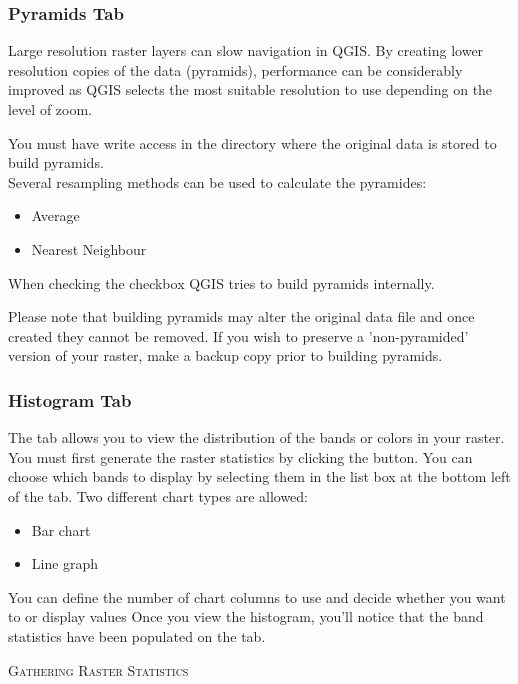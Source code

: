 \subsubsection{Pyramids Tab}\label{raster_pyramids}

Large resolution raster layers can slow navigation in QGIS. By creating lower
resolution copies of the data (pyramids), performance can be considerably
improved as QGIS selects the most suitable resolution to use depending on the
level of zoom.

You must have write access in the directory where the original data is stored
to build pyramids. \\
Several resampling methods can be used to calculate the pyramides:
\begin{itemize}
\item Average
\item Nearest Neighbour
\end{itemize}

When checking the checkbox  QGIS tries to build pyramids internally.

Please note that building pyramids may alter the original data file and once
created they cannot be removed. If you wish to preserve a 'non-pyramided'
version of your raster, make a backup copy prior to building pyramids.

\subsubsection{Histogram Tab}\label{label_histogram}

The  tab allows you to view the distribution 
of the bands or colors in your raster. You must first generate the raster statistics 
by clicking the  button. You can choose which bands to display by 
selecting them in the list box at the bottom left of the tab. Two different
chart types are allowed: 

\begin{itemize}
\item Bar chart
\item Line graph
\end{itemize}

You can define the number of chart columns to use and decide whether you want 
to  or display  values 
Once you view the histogram, you'll notice that the band statistics have been
populated on the  tab.

\begin{Tip}\caption{\textsc{Gathering Raster Statistics}}
\end{Tip}

